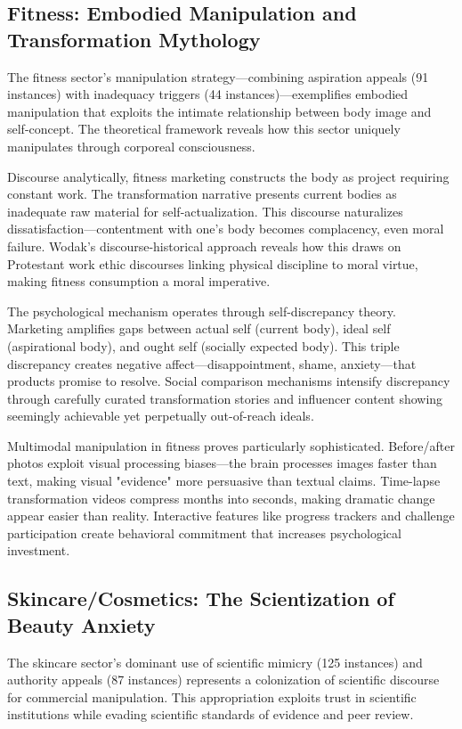 \subsection{Fitness: Embodied Manipulation and Transformation Mythology}

The fitness sector's manipulation strategy—combining aspiration appeals (91 instances) with inadequacy triggers (44 instances)—exemplifies embodied manipulation that exploits the intimate relationship between body image and self-concept. The theoretical framework reveals how this sector uniquely manipulates through corporeal consciousness.

Discourse analytically, fitness marketing constructs the body as project requiring constant work. The transformation narrative presents current bodies as inadequate raw material for self-actualization. This discourse naturalizes dissatisfaction—contentment with one's body becomes complacency, even moral failure. Wodak's discourse-historical approach reveals how this draws on Protestant work ethic discourses linking physical discipline to moral virtue, making fitness consumption a moral imperative.

The psychological mechanism operates through self-discrepancy theory. Marketing amplifies gaps between actual self (current body), ideal self (aspirational body), and ought self (socially expected body). This triple discrepancy creates negative affect—disappointment, shame, anxiety—that products promise to resolve. Social comparison mechanisms intensify discrepancy through carefully curated transformation stories and influencer content showing seemingly achievable yet perpetually out-of-reach ideals.

Multimodal manipulation in fitness proves particularly sophisticated. Before/after photos exploit visual processing biases—the brain processes images faster than text, making visual "evidence" more persuasive than textual claims. Time-lapse transformation videos compress months into seconds, making dramatic change appear easier than reality. Interactive features like progress trackers and challenge participation create behavioral commitment that increases psychological investment.

\subsection{Skincare/Cosmetics: The Scientization of Beauty Anxiety}

The skincare sector's dominant use of scientific mimicry (125 instances) and authority appeals (87 instances) represents a colonization of scientific discourse for commercial manipulation. This appropriation exploits trust in scientific institutions while evading scientific standards of evidence and peer review.

